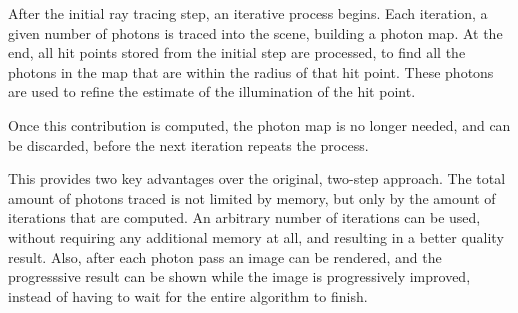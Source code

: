 \documentclass[main.tex]{subfiles}
\begin{document}
After the initial ray tracing step, an iterative process begins. Each iteration, a given number of photons is traced into the scene, building a photon map. At the end, all hit points stored from the initial step are processed, to find all the photons in the map that are within the radius of that hit point. These photons are used to refine the estimate of the illumination of the hit point.

Once this contribution is computed, the photon map is no longer needed, and can be discarded, before the next iteration repeats the process.

This provides two key advantages over the original, two-step approach. The total amount of photons traced is not limited by memory, but only by the amount of iterations that are computed. An arbitrary number of iterations can be used, without requiring any additional memory at all, and resulting in a better quality result. Also, after each photon pass an image can be rendered, and the progresssive result can be shown while the image is progressively improved, instead of having to wait for the entire algorithm to finish.
\end{document}
